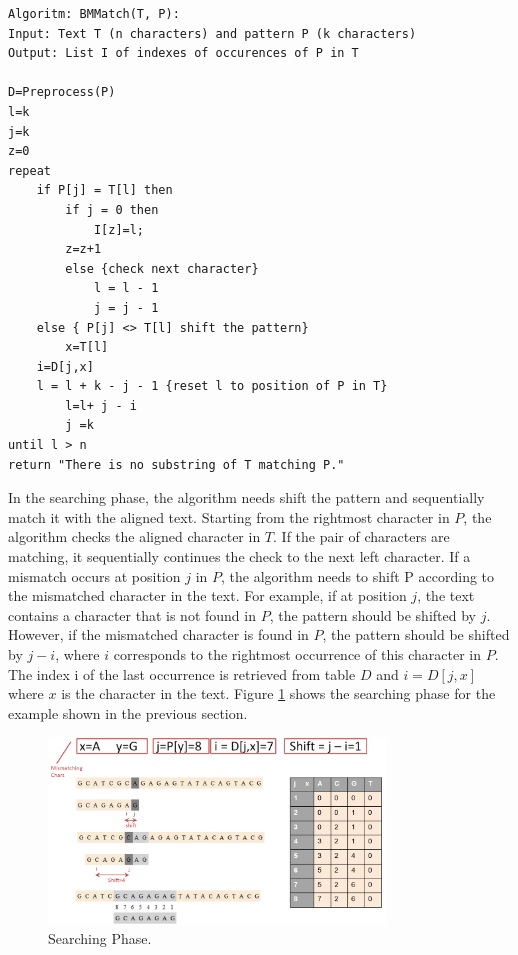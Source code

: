 \documentclass[paper=a4, fontsize=11pt]{scrartcl} %
\numberwithin{equation}{section} %
\numberwithin{figure}{section} %
\numberwithin{table}{section} %
\begin{document}
\begin{lstlisting}
Algoritm: BMMatch(T, P):
Input: Text T (n characters) and pattern P (k characters)
Output: List I of indexes of occurences of P in T

D=Preprocess(P)
l=k
j=k
z=0
repeat
    if P[j] = T[l] then
        if j = 0 then
            I[z]=l;
	    z=z+1
        else {check next character}
            l = l - 1
            j = j - 1
    else { P[j] <> T[l] shift the pattern}
        x=T[l]
	i=D[j,x]
	l = l + k - j - 1 {reset l to position of P in T}
        l=l+ j - i
        j =k
until l > n
return "There is no substring of T matching P."
\end{lstlisting}

\par In the searching phase, the algorithm needs shift the pattern and sequentially match it with the aligned text. Starting from the rightmost character in $P$, the algorithm checks the aligned character in $T$. If the pair of characters are matching, it sequentially continues the check to the next left character. If a mismatch occurs at position $j$ in $P$, the algorithm needs to shift P according to the mismatched character in the text. For example, if at position $j$, the text contains a character that is not found in $P$, the pattern should be shifted by $j$. However, if the mismatched character is found in $P$, the pattern should be shifted by $j-i$, where $i$ corresponds to the rightmost occurrence of this character in $P$. The index i of the last occurrence is retrieved from table $D$ and $i=D[j,x]$ where $x$ is the character in the text. Figure \ref{fig:search} shows the searching phase for the example shown in the previous section.

\begin{figure}[h!]
\centering
\includegraphics[width=0.8\textwidth]{figures/searching_phase.png}
\caption{Searching Phase.}
\label{fig:search}
\end{figure}
\end{document}
